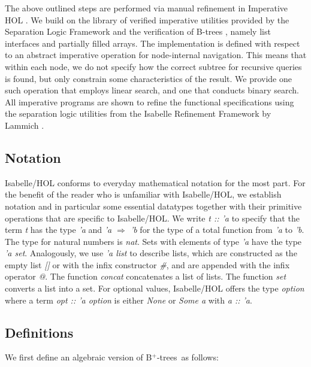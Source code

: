 \documentclass[runningheads]{llncs}
\newcommand{\btrees}{B$^+$-trees}
\begin{document}
The above outlined steps are performed via manual refinement in Imperative HOL \cite{DBLP:conf/tphol/BulwahnKHEM08}.
We build on the library of verified imperative utilities
provided by the Separation Logic Framework \cite{DBLP:journals/afp/LammichM12}
and the verification of B-trees \cite{DBLP:journals/afp/Mundler21},
namely list interfaces and partially filled arrays.
The implementation is defined with respect to an abstract imperative
operation for node-internal navigation.
This means that within each node, we do not specify
how the correct subtree for recursive queries is found,
but only constrain some characteristics of the result.
We provide one such operation that employs linear search,
and one that conducts binary search.
All imperative programs are shown to refine the functional specifications
using the separation logic utilities from the Isabelle Refinement Framework by
Lammich \cite{DBLP:journals/jar/Lammich19}.

\subsection{Notation}

Isabelle/HOL conforms to everyday mathematical notation for the most part.
For the benefit of the reader who is unfamiliar with Isabelle/HOL, we establish
notation and in particular some essential datatypes together with their primitive
operations that are specific to Isabelle/HOL. We write \textit{t :: 'a} to specify that
the term \textit{t} has the type \textit{'a} and \textit{'a $\Rightarrow$ 'b}
for the type of a total function from \textit{'a} to \textit{'b}.
The type for natural numbers is \textit{nat}.
Sets with elements of type \textit{'a} have the type \textit{'a set}.
Analogously, we use \textit{'a list} to describe lists, which are constructed as the empty
list \textit{[]} or with the infix constructor \textit{\#}, and are appended with the infix operator
\textit{@}. The function \textit{concat} concatenates a list of lists.
The function \textit{set} converts a list into a set. For optional values, Isabelle/HOL
offers the type \textit{option} where a term \textit{opt :: 'a option} is either \textit{None} or \textit{Some a}
with \textit{a :: 'a}.

\subsection{Definitions}
\label{sec:data_structure_defs}

We first define an algebraic version of \btrees\ as follows:
\end{document}
